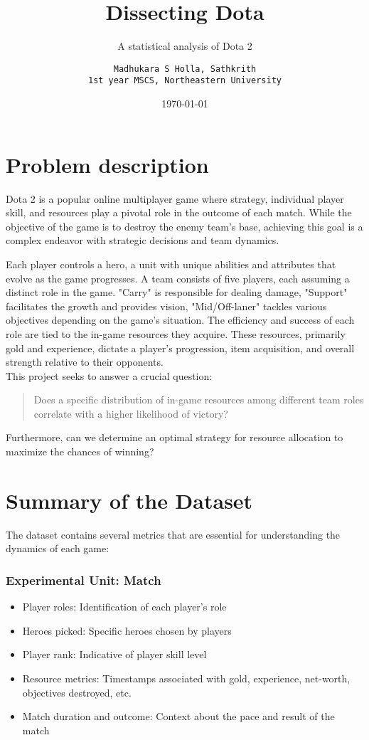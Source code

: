 \documentclass[12pt]{scrreprt}
\title{Dissecting Dota}
\subtitle{A statistical analysis of Dota 2}
\author{
    \texttt{Madhukara S Holla, Sathkrith}
    \\
    \texttt{1st year MSCS, Northeastern University}
}
\date{\today}
\begin{document}
\maketitle

\newpage
\section*{Problem description}
Dota 2 is a popular online multiplayer game where strategy, individual player skill,
and resources play a pivotal role in the outcome of each match.
While the objective of the game is to destroy the enemy team's base, achieving
this goal is a complex endeavor with strategic decisions and team dynamics.

Each player controls a hero, a unit with unique abilities and attributes that
evolve as the game progresses. A team consists of five players, each assuming
a distinct role in the game. "Carry" is responsible for dealing damage, "Support"
facilitates the growth and provides vision, "Mid/Off-laner" tackles various
objectives depending on the game's situation. The efficiency and success of each
role are tied to the in-game resources they acquire. These resources, primarily
gold and experience, dictate a player's progression, item acquisition, and
overall strength relative to their opponents.
\\[\baselineskip]
This project seeks to answer a crucial question:
\begin{quote}
Does a specific distribution of in-game resources among different team roles
correlate with a higher likelihood of victory?
\end{quote}
Furthermore, can we determine an optimal strategy for resource allocation to
maximize the chances of winning?

\section*{Summary of the Dataset}
The dataset contains several metrics that are essential for understanding the
dynamics of each game:
\subsubsection*{Experimental Unit: Match}
\begin{itemize}
    \item Player roles: Identification of each player's role
    \item Heroes picked: Specific heroes chosen by players
    \item Player rank: Indicative of player skill level
    \item Resource metrics: Timestamps associated with gold, experience,
    net-worth, objectives destroyed, etc.
    \item Match duration and outcome: Context about the pace and result of the match
\end{itemize}
\end{document}
